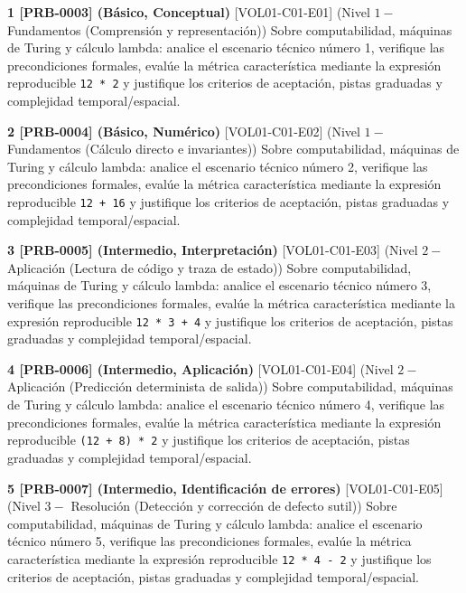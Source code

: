 \documentclass{book}
\begin{document}
\begin{tcolorbox}[title={Ejercicios}, studiumworked, breakable]

\noindent\textbf{1 [PRB-0003] (Básico, Conceptual)}
[VOL01-C01-E01] (Nivel \(1 -\) Fundamentos (Comprensión y representación)) Sobre computabilidad, máquinas de Turing y cálculo lambda: analice el escenario técnico número 1, verifique las precondiciones formales, evalúe la métrica característica mediante la expresión reproducible \texttt{12 * 2} y justifique los criterios de aceptación, pistas graduadas y complejidad temporal/espacial.

\noindent\textbf{2 [PRB-0004] (Básico, Numérico)}
[VOL01-C01-E02] (Nivel \(1 -\) Fundamentos (Cálculo directo e invariantes)) Sobre computabilidad, máquinas de Turing y cálculo lambda: analice el escenario técnico número 2, verifique las precondiciones formales, evalúe la métrica característica mediante la expresión reproducible \texttt{12 + 16} y justifique los criterios de aceptación, pistas graduadas y complejidad temporal/espacial.

\noindent\textbf{3 [PRB-0005] (Intermedio, Interpretación)}
[VOL01-C01-E03] (Nivel \(2 -\) Aplicación (Lectura de código y traza de estado)) Sobre computabilidad, máquinas de Turing y cálculo lambda: analice el escenario técnico número 3, verifique las precondiciones formales, evalúe la métrica característica mediante la expresión reproducible \texttt{12 * 3 + 4} y justifique los criterios de aceptación, pistas graduadas y complejidad temporal/espacial.

\noindent\textbf{4 [PRB-0006] (Intermedio, Aplicación)}
[VOL01-C01-E04] (Nivel \(2 -\) Aplicación (Predicción determinista de salida)) Sobre computabilidad, máquinas de Turing y cálculo lambda: analice el escenario técnico número 4, verifique las precondiciones formales, evalúe la métrica característica mediante la expresión reproducible \texttt{(12 + 8) * 2} y justifique los criterios de aceptación, pistas graduadas y complejidad temporal/espacial.

\noindent\textbf{5 [PRB-0007] (Intermedio, Identificación de errores)}
[VOL01-C01-E05] (Nivel \(3 -\) Resolución (Detección y corrección de defecto sutil)) Sobre computabilidad, máquinas de Turing y cálculo lambda: analice el escenario técnico número 5, verifique las precondiciones formales, evalúe la métrica característica mediante la expresión reproducible \texttt{12 * 4 - 2} y justifique los criterios de aceptación, pistas graduadas y complejidad temporal/espacial.


\end{tcolorbox}
\end{document}
